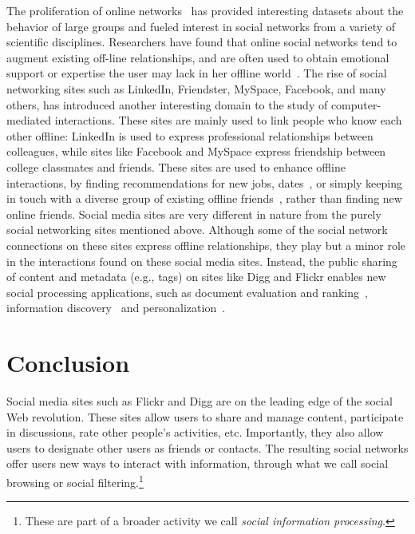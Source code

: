 \documentclass[]{article}
\begin{document}
The proliferation of online networks~\cite{Garton97} has provided
interesting datasets about the behavior of large
groups and fueled interest in social networks from a variety of scientific disciplines.
Researchers have found that online social networks tend to augment existing
off-line relationships, and are often used to obtain emotional
support or expertise the user may lack in her offline
world~\cite{PewInternet}.
The rise of social networking sites such as LinkedIn, Friendster, MySpace,
Facebook, and many others, has introduced another interesting
domain to the study of computer-mediated interactions. These sites
are mainly used to link people who know each other offline: LinkedIn
is used to express professional relationships between colleagues,
while sites like Facebook and MySpace express friendship between college classmates and friends.
These sites are used to enhance offline interactions, by finding
recommendations for new jobs, dates~\cite{boyd04}, or simply keeping in touch with a
diverse group of existing offline friends~\cite{lampe06}, rather than
finding new online friends.
Social media sites are very different in nature from the purely social
networking sites mentioned above. Although some of the social
network connections on these sites express offline relationships, they play
but a minor role in the interactions found on these social media
sites. Instead, the public sharing of content and
metadata (e.g., tags) on sites like Digg and Flickr enables new social processing
applications, such as document evaluation and
ranking~\cite{Lerman07ic,Lerman07kdd}, information
discovery~\cite{Plangrasopchok07} and
personalization~\cite{Lerman07flickrsearch}.




\section{Conclusion}
\label{sec:conclusion}

Social media sites such as Flickr and Digg are on the leading edge of the
social Web revolution. These sites allow users to share and manage
content, participate in discussions, rate other people's activities, etc.
Importantly, they also
allow users to designate other users as friends or contacts. The
resulting social networks offer users new ways to interact with
information, through what we call social browsing or social
filtering.\footnote{These are part of a broader activity we call \emph{social information processing}.}
\end{document}
